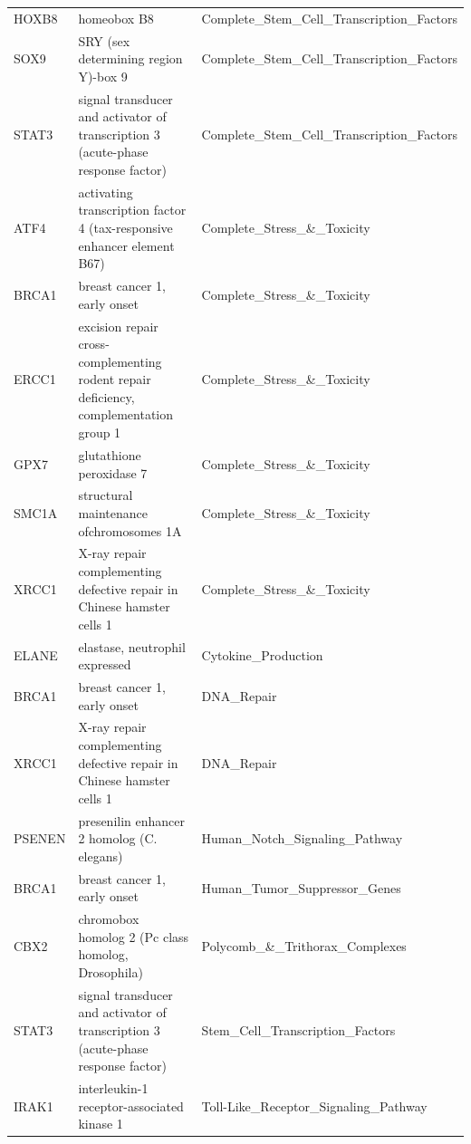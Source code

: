 \documentclass[11pt]{article}
\begin{document}
\begin{table}[H]
{\begin{tabular}{|l|l|l|}
    HOXB8  & homeobox B8                                                                           & Complete\_Stem\_Cell\_Transcription\_Factors \\
    SOX9   & SRY (sex determining region Y)-box 9                                                  & Complete\_Stem\_Cell\_Transcription\_Factors \\
    STAT3  & signal transducer and activator of transcription 3 (acute-phase response factor)      & Complete\_Stem\_Cell\_Transcription\_Factors \\
    ATF4   & activating transcription factor 4 (tax-responsive enhancer element B67)               & Complete\_Stress\_\&\_Toxicity           \\
    BRCA1  & breast cancer 1, early onset                                                          & Complete\_Stress\_\&\_Toxicity           \\
    ERCC1  & excision repair cross-complementing rodent repair deficiency, complementation group 1 & Complete\_Stress\_\&\_Toxicity           \\
    GPX7   & glutathione peroxidase 7                                                              & Complete\_Stress\_\&\_Toxicity           \\
    SMC1A  & structural maintenance ofchromosomes 1A                                               & Complete\_Stress\_\&\_Toxicity           \\
    XRCC1  & X-ray repair complementing defective repair in Chinese hamster cells 1                & Complete\_Stress\_\&\_Toxicity           \\
    ELANE  & elastase, neutrophil expressed                                                        & Cytokine\_Production                     \\
    BRCA1  & breast cancer 1, early onset                                                          & DNA\_Repair                              \\
    XRCC1  & X-ray repair complementing defective repair in Chinese hamster cells 1                & DNA\_Repair                              \\
    PSENEN & presenilin enhancer 2 homolog (C. elegans)                                            & Human\_Notch\_Signaling\_Pathway         \\
    BRCA1  & breast cancer 1, early onset                                                          & Human\_Tumor\_Suppressor\_Genes          \\
    CBX2   & chromobox homolog 2 (Pc class homolog, Drosophila)                                    & Polycomb\_\&\_Trithorax\_Complexes       \\
    STAT3  & signal transducer and activator of transcription 3 (acute-phase response factor)      & Stem\_Cell\_Transcription\_Factors       \\
    IRAK1  & interleukin-1 receptor-associated kinase 1                                            & Toll-Like\_Receptor\_Signaling\_Pathway  \\ \hline
    \end{tabular}}
\end{table}
\end{document}
